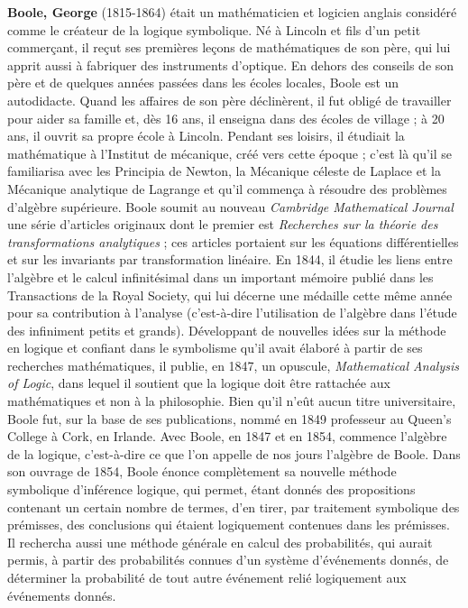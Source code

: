 \textbf{Boole, George} (1815-1864) était un mathématicien et logicien anglais considéré comme le créateur de la logique symbolique. Né à Lincoln et fils d'un petit commerçant, il reçut ses premières leçons de mathématiques de son père, qui lui apprit aussi à fabriquer des instruments d'optique. En dehors des conseils de son père et de quelques années passées dans les écoles locales, Boole est un autodidacte. Quand les affaires de son père déclinèrent, il fut obligé de travailler pour aider sa famille et, dès 16 ans, il enseigna dans des écoles de village ; à 20 ans, il ouvrit sa propre école à Lincoln. Pendant ses loisirs, il étudiait la mathématique à l'Institut de mécanique, créé vers cette époque ; c'est là qu'il se familiarisa avec les Principia de Newton, la Mécanique céleste de Laplace et la Mécanique analytique de Lagrange et qu'il commença à résoudre des problèmes d'algèbre supérieure. Boole soumit au nouveau \textit{Cambridge Mathematical Journal} une série d'articles originaux dont le premier est \textit{Recherches sur la théorie des transformations analytiques} ; ces articles portaient sur les équations différentielles et sur les invariants par transformation linéaire. En 1844, il étudie les liens entre l'algèbre et le calcul infinitésimal dans un important mémoire publié dans les Transactions de la Royal Society, qui lui décerne une médaille cette même année pour sa contribution à l'analyse (c'est-à-dire l'utilisation de l'algèbre dans l'étude des infiniment petits et grands). Développant de nouvelles idées sur la méthode en logique et confiant dans le symbolisme qu'il avait élaboré à partir de ses recherches mathématiques, il publie, en 1847, un opuscule, \textit{Mathematical Analysis of Logic}, dans lequel il soutient que la logique doit être rattachée aux mathématiques et non à la philosophie. Bien qu'il n'eût aucun titre universitaire, Boole fut, sur la base de ses publications, nommé en 1849 professeur au Queen's College à Cork, en Irlande. Avec Boole, en 1847 et en 1854, commence l'algèbre de la logique, c'est-à-dire ce que l'on appelle de nos jours l'algèbre de Boole. Dans son ouvrage de 1854, Boole énonce complètement sa nouvelle méthode symbolique d'inférence logique, qui permet, étant donnés des propositions contenant un certain nombre de termes, d'en tirer, par traitement symbolique des prémisses, des conclusions qui étaient logiquement contenues dans les prémisses. Il rechercha aussi une méthode générale en calcul des probabilités, qui aurait permis, à partir des probabilités connues d'un système d'événements donnés, de déterminer la probabilité de tout autre événement relié logiquement aux événements donnés.

